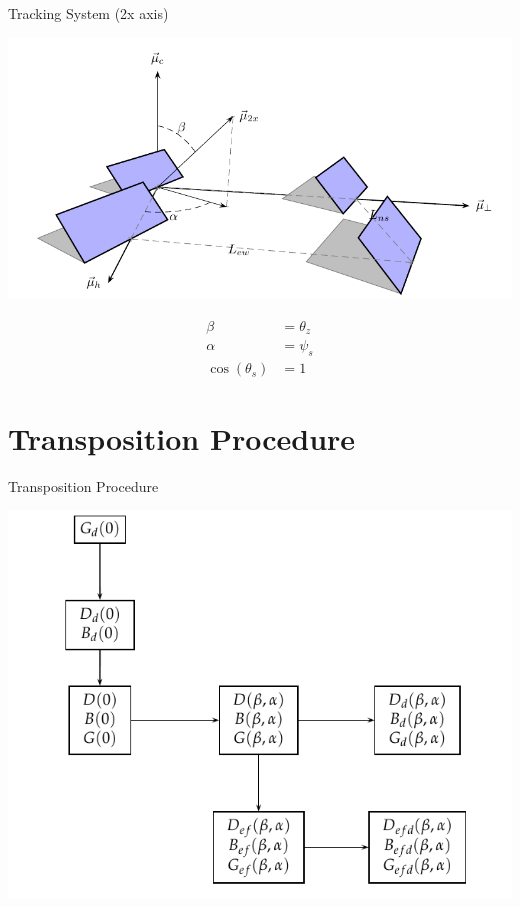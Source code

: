 \documentclass[xcolor={usenames,svgnames,dvipsnames}]{beamer}
\begin{document}
\begin{frame}[plain,label={sec:orgcc911c7}]{Tracking System (2x axis)}
\begin{center}
\includegraphics[width=.9\linewidth]{../figs/Sombra2X.pdf}
\end{center}


\begin{align*}
  \beta &= \theta_{z}\\
  \alpha &= \psi_{s}\\
  \cos(\theta_{s}) &= 1
\end{align*}
\end{frame}




\section{Transposition Procedure}
\label{sec:orgea55d15}

\begin{frame}[label={sec:org0984292}]{Transposition Procedure}
\begin{center}
\includegraphics[width=.9\linewidth]{../figs/ProcedimientoCalculoRadiacionInclinada.pdf}
\end{center}
\end{frame}
\end{document}
